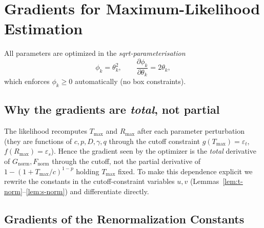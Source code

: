 \documentclass[11pt,a4paper]{article}
\theoremstyle{plain}
\theoremstyle{definition}
\newcommand{\eps}{\varepsilon}
\newcommand{\Gnorm}{G_{\mathrm{norm}}}
\newcommand{\Fnorm}{F_{\mathrm{norm}}}
\newcommand{\Tmax}{T_{\max}}
\newcommand{\Rmax}{R_{\max}}
\begin{document}
\section{Gradients for Maximum-Likelihood Estimation}\label{sec:gradients}

All parameters are optimized in the \emph{sqrt-parameterisation}
\begin{equation}\label{eq:sqrt-param}
\phi_k = \theta_k^2,\qquad
\frac{\partial\phi_k}{\partial\theta_k}=2\theta_k,
\end{equation}
which enforces $\phi_k\ge 0$ automatically (no box constraints).

\subsection{Why the gradients are \emph{total}, not partial}\label{sec:total-vs-partial}

The likelihood recomputes $\Tmax$ and $\Rmax$ after each parameter perturbation
(they are functions of $c,p,D,\gamma,q$ through the cutoff constraint
$g(\Tmax)=\eps_t$, $f(\Rmax)=\eps_s$). Hence the gradient seen by the optimizer
is the \emph{total} derivative of $\Gnorm,\Fnorm$ through the cutoff, not the
partial derivative of $1-(1+\Tmax/c)^{1-p}$ holding $\Tmax$ fixed. To make this
dependence explicit we rewrite the constants in the cutoff-constraint
variables $u,v$ (Lemmas~\ref{lem:t-norm}--\ref{lem:s-norm}) and differentiate
directly.

\subsection{Gradients of the Renormalization Constants}\label{sec:renorm-grad}
\end{document}
